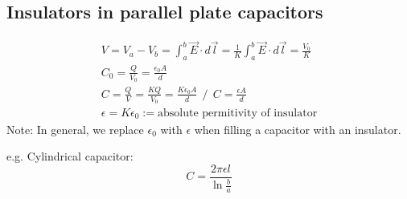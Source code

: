 \documentclass[a4paper, 11pt, fleqn, normalem]{report}
\begin{document}
\chapter{}
\section{Insulators in parallel plate capacitors}
\begin{gather*}
    V = V_{a} - V_{b} = \int_{a}^{b} \vec{E} \cdot d\vec{l} = \frac{1}{K} \int_{a}^{b} \vec{E}\cdot d\vec{l} = \frac{V_{0}}{K} \\
    C_{0} = \frac{Q}{V_{0}} = \frac{\epsilon_{0} A}{d} \\
    C = \frac{Q}{V} = \frac{KQ}{V_{0}} = \frac{K\epsilon_{0}A}{d} ~~ \Big/ ~~ C = \frac{\epsilon A}{d} \\
    \epsilon = K\epsilon_{0} := \text{absolute permitivity of insulator}
\end{gather*}
Note: In general, we replace $\epsilon_{0}$ with $\epsilon$ when filling a capacitor with an insulator.

e.g. Cylindrical capacitor:
\begin{equation*}
    C = \frac{2\pi\epsilon l}{\ln\tfrac{b}{a}}
\end{equation*}
\end{document}
